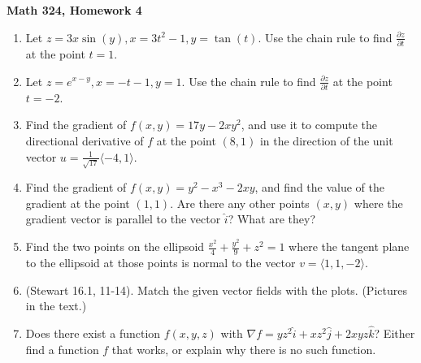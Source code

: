 \documentclass[11 pt]{report}
\begin{document}
\centerline{\bf Math 324, Homework 4}


\vspace{.2cm}

\begin{enumerate} \item Let $z = 3x\sin(y), x = 3t^2-1, y = \tan(t)$. Use the chain rule to find $\frac{\partial z}{\partial t}$ at the point $t = 1$. 

\item Let $z = e^{x-y}, x =  -t-1, y = 1.$ Use the chain rule to find $\frac{\partial z}{\partial t}$ at the point $t = -2$. 

\item Find the gradient of $f(x,y) = 17y-2xy^2$, and use it to compute the directional derivative of $f$ at the point $(8,1)$ in the direction of the unit vector $u = \frac{1}{\sqrt{17}} \langle -4, 1 \rangle$. 

\item Find the gradient of $f(x,y) = y^2 - x^3 - 2xy$, and find the value of the gradient at the point $(1,1)$. Are there any other points $(x,y)$ where the gradient vector is parallel to the vector $\hat{i}$? What are they?

\item Find the two points on the ellipsoid $\frac{x^2}{4}+\frac{y^2}{9} + z^2 = 1$ where the tangent plane to the ellipsoid at those points is normal to the vector $v = \langle 1, 1, -2 \rangle$. 

\item (Stewart 16.1, 11-14). Match the given vector fields with the plots. (Pictures in the text.)

\item Does there exist a function $f(x,y,z)$ with $\nabla f =yz^2 \hat{i} + xz^2 \hat{j} + 2xyz \hat{k}$? Either find a function $f$ that works, or explain why there is no such function. 



\end{enumerate}
\end{document}
